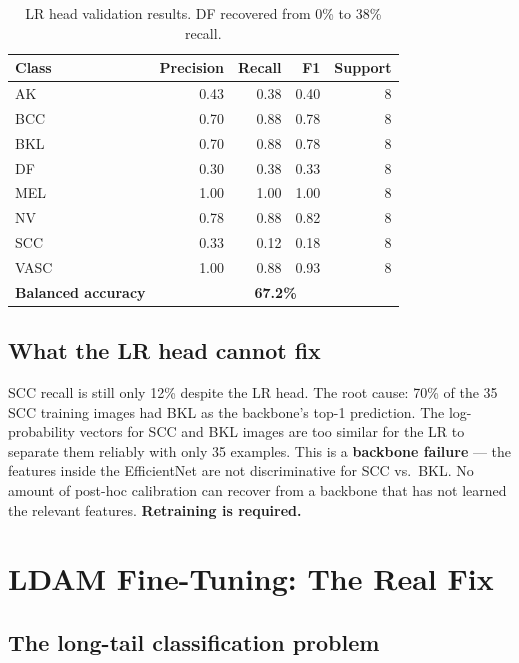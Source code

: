 \documentclass[12pt,a4paper]{article}
\begin{document}
\begin{table}[h]
\centering
\begin{tabular}{lrrrr}
\toprule
\textbf{Class} & \textbf{Precision} & \textbf{Recall} & \textbf{F1} & \textbf{Support} \\
\midrule
AK   & 0.43 & 0.38 & 0.40 & 8 \\
BCC  & 0.70 & 0.88 & 0.78 & 8 \\
BKL  & 0.70 & 0.88 & 0.78 & 8 \\
DF   & 0.30 & 0.38 & 0.33 & 8 \\
MEL  & 1.00 & 1.00 & 1.00 & 8 \\
NV   & 0.78 & 0.88 & 0.82 & 8 \\
SCC  & 0.33 & 0.12 & 0.18 & 8 \\
VASC & 1.00 & 0.88 & 0.93 & 8 \\
\midrule
\textbf{Balanced accuracy} & \multicolumn{4}{c}{\textbf{67.2\%}} \\
\bottomrule
\end{tabular}
\caption{LR head validation results. DF recovered from 0\% to 38\% recall.}
\end{table}

\subsection{What the LR head cannot fix}

SCC recall is still only 12\% despite the LR head. The root cause: 70\% of the 35 SCC training
images had BKL as the backbone's top-1 prediction. The log-probability vectors for SCC and BKL
images are too similar for the LR to separate them reliably with only 35 examples. This is a
\textbf{backbone failure} --- the features inside the EfficientNet are not discriminative for
SCC vs.\ BKL. No amount of post-hoc calibration can recover from a backbone that has not
learned the relevant features. \textbf{Retraining is required.}

\section{LDAM Fine-Tuning: The Real Fix}

\subsection{The long-tail classification problem}
\end{document}
